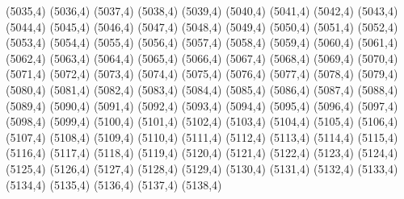 (5035,4)
(5036,4)
(5037,4)
(5038,4)
(5039,4)
(5040,4)
(5041,4)
(5042,4)
(5043,4)
(5044,4)
(5045,4)
(5046,4)
(5047,4)
(5048,4)
(5049,4)
(5050,4)
(5051,4)
(5052,4)
(5053,4)
(5054,4)
(5055,4)
(5056,4)
(5057,4)
(5058,4)
(5059,4)
(5060,4)
(5061,4)
(5062,4)
(5063,4)
(5064,4)
(5065,4)
(5066,4)
(5067,4)
(5068,4)
(5069,4)
(5070,4)
(5071,4)
(5072,4)
(5073,4)
(5074,4)
(5075,4)
(5076,4)
(5077,4)
(5078,4)
(5079,4)
(5080,4)
(5081,4)
(5082,4)
(5083,4)
(5084,4)
(5085,4)
(5086,4)
(5087,4)
(5088,4)
(5089,4)
(5090,4)
(5091,4)
(5092,4)
(5093,4)
(5094,4)
(5095,4)
(5096,4)
(5097,4)
(5098,4)
(5099,4)
(5100,4)
(5101,4)
(5102,4)
(5103,4)
(5104,4)
(5105,4)
(5106,4)
(5107,4)
(5108,4)
(5109,4)
(5110,4)
(5111,4)
(5112,4)
(5113,4)
(5114,4)
(5115,4)
(5116,4)
(5117,4)
(5118,4)
(5119,4)
(5120,4)
(5121,4)
(5122,4)
(5123,4)
(5124,4)
(5125,4)
(5126,4)
(5127,4)
(5128,4)
(5129,4)
(5130,4)
(5131,4)
(5132,4)
(5133,4)
(5134,4)
(5135,4)
(5136,4)
(5137,4)
(5138,4)